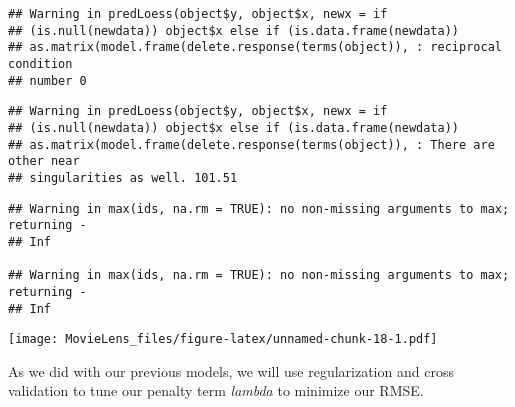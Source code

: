 \documentclass[
]{article}
\begin{document}
\begin{verbatim}
## Warning in predLoess(object$y, object$x, newx = if
## (is.null(newdata)) object$x else if (is.data.frame(newdata))
## as.matrix(model.frame(delete.response(terms(object)), : reciprocal condition
## number 0
\end{verbatim}

\begin{verbatim}
## Warning in predLoess(object$y, object$x, newx = if
## (is.null(newdata)) object$x else if (is.data.frame(newdata))
## as.matrix(model.frame(delete.response(terms(object)), : There are other near
## singularities as well. 101.51
\end{verbatim}

\begin{verbatim}
## Warning in max(ids, na.rm = TRUE): no non-missing arguments to max; returning -
## Inf

## Warning in max(ids, na.rm = TRUE): no non-missing arguments to max; returning -
## Inf
\end{verbatim}

\texttt{[image: MovieLens\_files/figure-latex/unnamed-chunk-18-1.pdf]}

As we did with our previous models, we will use regularization and cross
validation to tune our penalty term \emph{lambda} to minimize our RMSE.
\end{document}
